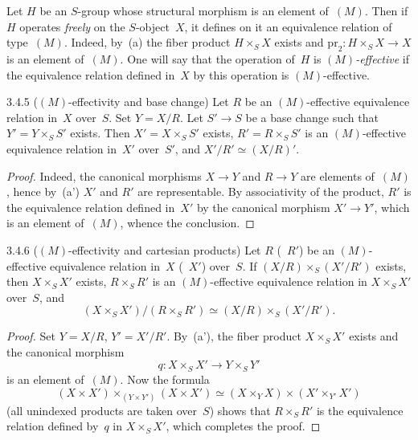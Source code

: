 \label{IV.3.4.4}
Let \(H\) be an \(S\)-group whose structural morphism is an element
of~\((M)\). Then if \(H\) operates \emph{freely} on the \(S\)-object~\(X\), it
defines on it an equivalence relation of type~\((M)\). Indeed, by~(a) the
fiber product \(H\times_{S}X\) exists and
\(\mathrm{pr}_{2}\colon H\times_{S}X\to X\) is an element of~\((M)\). One
will say that the operation of~\(H\) is \emph{\((M)\)-effective} if the
equivalence relation defined in~\(X\) by this operation is
\((M)\)-effective.

\begin{proposition}{3.4.5 ($(M)$-effectivity and base change)}
\label{IV.3.4.5}
Let \(R\) be an \((M)\)-effective equivalence relation in~\(X\) over~\(S\).
Set \(Y=X/R\). Let \(S'\to S\) be a base change such that
\(Y'=Y\times_{S}S'\) exists. Then \(X'=X\times_{S}S'\) exists,
\(R'=R\times_{S}S'\) is an \((M)\)-effective equivalence relation in~\(X'\)
over~\(S'\), and \(X'/R'\simeq(X/R)'\).
\end{proposition}

\begin{proof}
Indeed, the canonical morphisms \(X\to Y\) and \(R\to Y\) are elements
of~\((M)\), hence by~(a') \(X'\) and \(R'\) are representable. By
associativity of the product, \(R'\) is the equivalence relation defined
in~\(X'\) by the canonical morphism \(X'\to Y'\), which is an element
of~\((M)\), whence the conclusion.
\end{proof}

\begin{proposition}{3.4.6 ($(M)$-effectivity and cartesian products)}
\label{IV.3.4.6}
Let \(R\) (\resp~\(R'\)) be an \((M)\)-effective equivalence relation in~\(X\)
(\resp~\(X'\)) over~\(S\). If \((X/R)\times_{S}(X'/R')\) exists, then
\(X\times_{S}X'\) exists, \(R\times_{S}R'\) is an \((M)\)-effective
equivalence relation in \(X\times_{S}X'\) over~\(S\), and
\[
(X\times_{S}X')/(R\times_{S}R')
\simeq
(X/R)\times_{S}(X'/R').
\]
\end{proposition}

\begin{proof}
Set \(Y=X/R\), \(Y'=X'/R'\). By~(a'), the fiber product
\(X\times_{S}X'\) exists and the canonical morphism
\[
q\colon X\times_{S}X'\longrightarrow Y\times_{S}Y'
\]
is an element of~\((M)\). Now the formula
\[
(X\times X')\times_{(Y\times Y')}(X\times X')
\simeq
(X\times_{Y}X)\times(X'\times_{Y'}X')
\]
(all unindexed products are taken over~\(S\)) shows that \(R\times_{S}R'\)
is the equivalence relation defined by~\(q\) in \(X\times_{S}X'\), which
completes the proof.
\end{proof}
